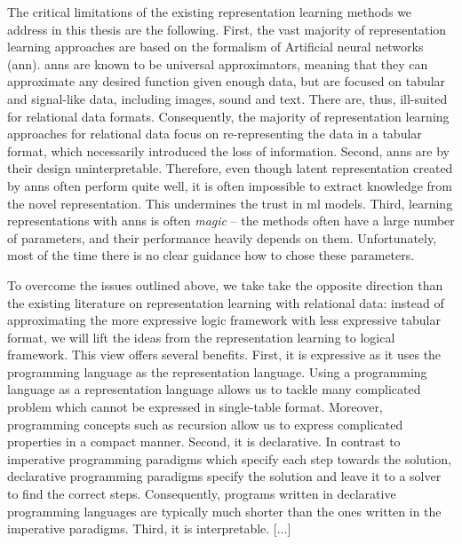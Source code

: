 The critical limitations of the existing representation learning methods we address in this thesis are the  following.
First, the vast majority of representation learning approaches are based on the formalism of Artificial neural networks (\gls{ann}).
\gls{ann}s are known to be universal approximators, meaning that they can approximate any desired function given enough data, but are focused on tabular and signal-like data, including images, sound and text.
There are, thus, ill-suited for relational data formats.
Consequently, the majority of representation learning approaches for relational data focus on re-representing the data in a tabular format, which necessarily introduced the loss of information.
Second, \gls{ann}s are by their design uninterpretable.
Therefore, even though latent representation created by \gls{ann}s often perform quite well, it is often impossible to extract knowledge from the novel representation.
This undermines the trust in \gls{ml} models.
Third, learning representations with \gls{ann}s is often \textit{magic} --  the methods often have a large number of parameters, and their performance heavily depends on them.
Unfortunately, most of the time there is no clear guidance how to chose these parameters.







To overcome the issues outlined above, we take take the opposite direction than the existing literature on representation learning with relational data: instead of approximating the more expressive logic framework with less expressive tabular format, we will lift the ideas from the representation learning to logical framework.
This view offers several benefits.
First, it is expressive as it uses the programming language as the representation language. 
Using a programming language as a representation language allows us to tackle many complicated problem which cannot be expressed in single-table format.
Moreover, programming concepts such as recursion allow us to express complicated properties in a compact manner.
Second, it is declarative. 
In contrast to imperative programming paradigms which specify each step towards the solution, declarative programming paradigms specify the solution and leave it to a solver to find the correct steps.
Consequently, programs written in declarative programming languages are typically much shorter than the ones written in the imperative paradigms.
Third, it is interpretable. [...]



